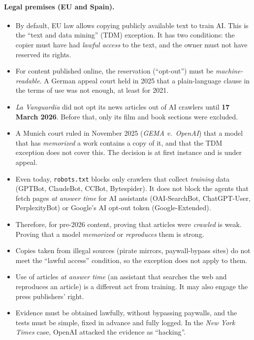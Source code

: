 \documentclass[10pt,a4paper]{article}
\begin{document}
\paragraph{Legal premises (EU and Spain).}
\begin{itemize}
\item By default, EU law allows copying publicly available text to train AI. This is the ``text and data mining''
(TDM) exception. It has two conditions: the copier must have had \emph{lawful access} to the text, and the owner must
not have reserved its rights.
\item For content published online, the reservation (``opt-out'') must be \emph{machine-readable}. A German appeal
court held in 2025 that a plain-language clause in the terms of use was not enough, at least for 2021.
\item \emph{La Vanguardia} did not opt its news articles out of AI crawlers until \textbf{17 March 2026}. Before that,
only its film and book sections were excluded.
\item A Munich court ruled in November 2025 (\emph{GEMA v.\ OpenAI}) that a model that has \emph{memorized} a work
contains a copy of it, and that the TDM exception does not cover this. The decision is at first instance and is under
appeal.
\item Even today, \texttt{robots.txt} blocks only crawlers that collect \emph{training} data (GPTBot, ClaudeBot,
CCBot, Bytespider). It does not block the agents that fetch pages \emph{at answer time} for AI assistants
(OAI-SearchBot, ChatGPT-User, PerplexityBot) or Google's AI opt-out token (Google-Extended).
\item Therefore, for pre-2026 content, proving that articles were \emph{crawled} is weak. Proving that a model
\emph{memorized} or \emph{reproduces} them is strong.
\item Copies taken from illegal sources (pirate mirrors, paywall-bypass sites) do not meet the ``lawful access''
condition, so the exception does not apply to them.
\item Use of articles \emph{at answer time} (an assistant that searches the web and reproduces an article) is a
different act from training. It may also engage the press publishers' right.
\item Evidence must be obtained lawfully, without bypassing paywalls, and the tests must be simple, fixed in advance
and fully logged. In the \emph{New York Times} case, OpenAI attacked the evidence as ``hacking''.
\end{itemize}
\end{document}
